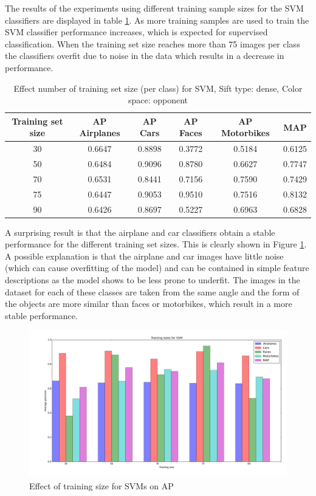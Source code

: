 The results of the experiments using different training sample sizes for the SVM classifiers are displayed in table \ref{tab:svm}. As more training samples are used to train the SVM classifier performance increases, which is expected for supervised classification. When the training set size reaches more than 75 images per class the classifiers overfit due to noise in the data which results in a decrease in performance.
  
\begin{table}[H]
\begin{tabular}{|c|ccccc|}
\hline
\textbf{Training set size} & \textbf{AP Airplanes} & \textbf{AP Cars} & \textbf{AP Faces} & \textbf{AP Motorbikes} & \textbf{MAP}\\
\hline
30 & 0.6647 & 0.8898 & 0.3772 & 0.5184& 0.6125\\
50 & 0.6484 & 0.9096 & 0.8780 & 0.6627 & 0.7747\\
70 & 0.6531 & 0.8441 & 0.7156 & 0.7590 & 0.7429\\
75 & 0.6447 & 0.9053 & 0.9510 & 0.7516 & 0.8132\\
90 & 0.6426 & 0.8697 & 0.5227 & 0.6963 & 0.6828\\
\hline
\end{tabular}
\caption{Effect number of training set size (per class) for SVM, Sift type: dense, Color space: opponent}
\label{tab:svm}
\end{table}

A surprising result is that the airplane and car classifiers obtain a stable performance for the different training set sizes. This is clearly shown in Figure \ref{fig:svm}. A possible explanation is that the airplane and car images have little noise (which can cause overfitting of the model) and can be contained in simple feature descriptions as the model shows to be less prone to underfit. The images in the dataset for each of these classes are taken from the same angle and the form of the objects are more similar than faces or motorbikes, which result in a more stable performance.

\begin{figure}[H]
\includegraphics[width=\textwidth]{../plots/training_size_SVM}
\caption{Effect of training size for SVMs on AP}
\label{fig:svm}
\end{figure}
